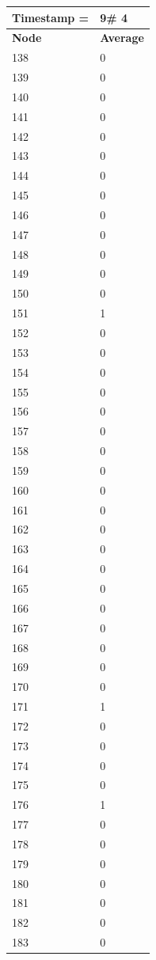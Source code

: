 \begin{tabular}{|l||l|}
\hline
\textbf{Timestamp =} & \textbf{9}\# 4\\\hline
	\textbf{Node} & \textbf{Average} \\ \hline
\hline
	138 & 0 \\ \hline
	139 & 0 \\ \hline
	140 & 0 \\ \hline
	141 & 0 \\ \hline
	142 & 0 \\ \hline
	143 & 0 \\ \hline
	144 & 0 \\ \hline
	145 & 0 \\ \hline
	146 & 0 \\ \hline
	147 & 0 \\ \hline
	148 & 0 \\ \hline
	149 & 0 \\ \hline
	150 & 0 \\ \hline
	151 & 1 \\ \hline
	152 & 0 \\ \hline
	153 & 0 \\ \hline
	154 & 0 \\ \hline
	155 & 0 \\ \hline
	156 & 0 \\ \hline
	157 & 0 \\ \hline
	158 & 0 \\ \hline
	159 & 0 \\ \hline
	160 & 0 \\ \hline
	161 & 0 \\ \hline
	162 & 0 \\ \hline
	163 & 0 \\ \hline
	164 & 0 \\ \hline
	165 & 0 \\ \hline
	166 & 0 \\ \hline
	167 & 0 \\ \hline
	168 & 0 \\ \hline
	169 & 0 \\ \hline
	170 & 0 \\ \hline
	171 & 1 \\ \hline
	172 & 0 \\ \hline
	173 & 0 \\ \hline
	174 & 0 \\ \hline
	175 & 0 \\ \hline
	176 & 1 \\ \hline
	177 & 0 \\ \hline
	178 & 0 \\ \hline
	179 & 0 \\ \hline
	180 & 0 \\ \hline
	181 & 0 \\ \hline
	182 & 0 \\ \hline
	183 & 0 \\ \hline
\end{tabular}
